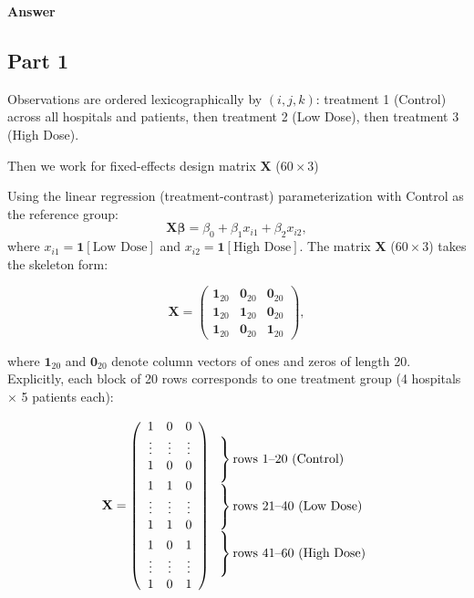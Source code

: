 \documentclass[letterpaper]{article}
\begin{document}
		\textbf{Answer}
		
	\subsection{Part 1}
			
			Observations are ordered lexicographically by $(i,j,k)$:
			treatment 1 (Control) across all hospitals and patients, then treatment 2
			(Low Dose), then treatment 3 (High Dose).
			
			Then we work for {fixed-effects design matrix $\mathbf{X}$ ($60 \times 3$)}
			
			Using the linear regression (treatment-contrast) parameterization with Control
			as the reference group:
			\[
			\mathbf{X}\boldsymbol{\beta} = \beta_0 + \beta_1 x_{i1} + \beta_2 x_{i2},
			\]
			where $x_{i1} = \mathbf{1}[\text{Low Dose}]$ and $x_{i2} = \mathbf{1}[\text{High Dose}]$.
			The matrix $\mathbf{X}$ ($60\times 3$) takes the skeleton form:
			
			\[
			\mathbf{X} =
			\begin{pmatrix}
				\mathbf{1}_{20} & \mathbf{0}_{20} & \mathbf{0}_{20} \\
				\mathbf{1}_{20} & \mathbf{1}_{20} & \mathbf{0}_{20} \\
				\mathbf{1}_{20} & \mathbf{0}_{20} & \mathbf{1}_{20}
			\end{pmatrix},
			\]
			
			where $\mathbf{1}_{20}$ and $\mathbf{0}_{20}$ denote column vectors of ones
			and zeros of length 20. Explicitly, each block of 20 rows corresponds to one
			treatment group (4 hospitals $\times$ 5 patients each):
			
		\[
		\mathbf{X} = \left(
		\begin{array}{ccc}
			1 & 0 & 0 \\
			\vdots & \vdots & \vdots \\
			1 & 0 & 0 \\[4pt]
			1 & 1 & 0 \\
			\vdots & \vdots & \vdots \\
			1 & 1 & 0 \\[4pt]
			1 & 0 & 1 \\
			\vdots & \vdots & \vdots \\
			1 & 0 & 1
		\end{array}
		\right)
		\begin{array}{l}
			\left.\rule{0pt}{5ex}\right\} \text{rows 1--20 (Control)} \\[4pt]
			\left.\rule{0pt}{5ex}\right\} \text{rows 21--40 (Low Dose)} \\[4pt]
			\left.\rule{0pt}{5ex}\right\} \text{rows 41--60 (High Dose)}
		\end{array}
		\]
			
\end{document}

